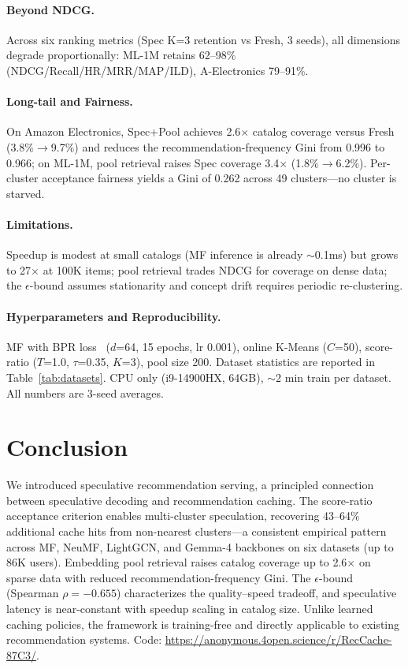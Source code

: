 \documentclass[sigconf,nonacm=false]{acmart}
\begin{document}
\paragraph{Beyond NDCG.}
Across six ranking metrics (Spec K=3 retention vs Fresh, 3 seeds), all dimensions degrade proportionally: ML-1M retains 62--98\% (NDCG/Recall/HR/MRR/MAP/ILD), A-Electronics 79--91\%.

\paragraph{Long-tail and Fairness.}
On Amazon Electronics, Spec+Pool achieves 2.6$\times$ catalog coverage versus Fresh (3.8\%$\to$9.7\%) and reduces the recommendation-frequency Gini from 0.996 to 0.966; on ML-1M, pool retrieval raises Spec coverage 3.4$\times$ (1.8\%$\to$6.2\%). Per-cluster acceptance fairness yields a Gini of 0.262 across 49 clusters---no cluster is starved.

\paragraph{Limitations.}
Speedup is modest at small catalogs (MF inference is already $\sim$0.1ms) but grows to 27$\times$ at 100K items; pool retrieval trades NDCG for coverage on dense data; the $\epsilon$-bound assumes stationarity and concept drift requires periodic re-clustering.

\paragraph{Hyperparameters and Reproducibility.}
MF with BPR loss~\cite{koren2009matrix} ($d$=64, 15 epochs, lr 0.001), online K-Means ($C$=50), score-ratio ($T$=1.0, $\tau$=0.35, $K$=3), pool size 200. Dataset statistics are reported in Table~\ref{tab:datasets}. CPU only (i9-14900HX, 64GB), $\sim$2 min train per dataset. All numbers are 3-seed averages.


\section{Conclusion}

We introduced speculative recommendation serving, a principled connection between speculative decoding and recommendation caching. The score-ratio acceptance criterion enables multi-cluster speculation, recovering 43--64\% additional cache hits from non-nearest clusters---a consistent empirical pattern across MF, NeuMF, LightGCN, and Gemma-4 backbones on six datasets (up to 86K users). Embedding pool retrieval raises catalog coverage up to 2.6$\times$ on sparse data with reduced recommendation-frequency Gini. The $\epsilon$-bound (Spearman $\rho=-0.655$) characterizes the quality--speed tradeoff, and speculative latency is near-constant with speedup scaling in catalog size. Unlike learned caching policies, the framework is training-free and directly applicable to existing recommendation systems. Code: \url{https://anonymous.4open.science/r/RecCache-87C3/}.



\end{document}
